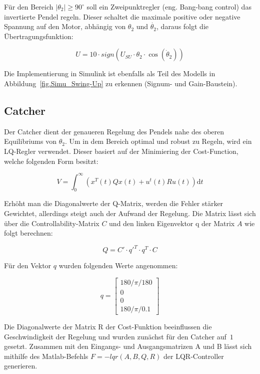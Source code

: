 Für den Bereich $\left| \theta_2 \right| \geq 90^\circ$ soll ein Zweipunktregler (eng. Bang-bang control) das invertierte Pendel regeln. Dieser schaltet die maximale positive oder negative Spannung auf den Motor, abhängig von $ \theta_2 $ und $ \dot{\theta_2} $, daraus folgt die Übertragungsfunktion:

\begin{equation}
U = 10 \cdot sign(U_{SU} \cdot \theta_2 \cdot \cos(\dot{\theta}_2))
\end{equation}

Die Implementierung in Simulink ist ebenfalls als Teil des Modells in Abbildung~\ref{fig.Simu_Swing-Up} zu erkennen (Signum- und Gain-Baustein).


\subsection{Catcher}
\label{catcher} 

Der Catcher dient der genaueren Regelung des Pendels nahe des oberen Equilibriums von $ \theta_2 $. Um in dem Bereich optimal und robust zu Regeln, wird ein LQ-Regler verwendet. Dieser basiert auf der Minimiering der Cost-Function, welche folgenden Form besitzt:

\begin{equation}
 V = \int_0^\infty \! (x^T(t) Qx(t) + u^t(t) R u(t))  \mathrm{d}t
\end{equation}

Erhöht man die Diagonalwerte der Q-Matrix, werden die Fehler stärker Gewichtet, allerdings steigt auch der Aufwand der Regelung. Die Matrix lässt sich über die Controllability-Matrix $C$ und den linken Eigenvektor q der Matrix $A$
wie folgt berechnen:

\begin{equation}
 Q = C' \cdot q'^T \cdot q^T \cdot C
\end{equation}

Für den Vektor $q$ wurden folgenden Werte angenommen:

\begin{equation}
q =\begin{bmatrix}
         180/\pi/180 \\
         0\\
         0\\
         180/\pi/0.1
        \end{bmatrix}
\end{equation}
 
Die Diagonalwerte der Matrix R der Cost-Funktion beeinflussen die Geschwindigkeit der Regelung und wurden zunächst für den Catcher auf~$1$ gesetzt.
Zusammen mit den Eingangs- und Ausgangsmatrizen A und B lässt sich mithilfe des Matlab-Befehls $F = -lqr(A,B,Q,R)$ der LQR-Controller generieren.


